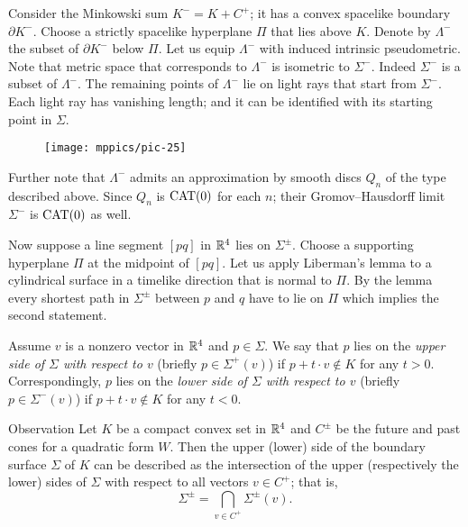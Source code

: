 \documentclass{article}
\begin{document}
Consider the Minkowski sum $K^-=K+C^+$;
it has a convex spacelike boundary $\partial K^-$.
Choose a strictly spacelike hyperplane $\Pi$ that lies above $K$.
Denote by $\Lambda^-$ the subset of $\partial K^-$ below $\Pi$.
Let us equip $\Lambda^-$ with induced intrinsic pseudometric.
Note that metric space that corresponds to $\Lambda^-$ is isometric to $\Sigma^-$.
Indeed $\Sigma^-$ is a subset of $\Lambda^-$.
The remaining points of $\Lambda^-$ lie on light rays that start from $\Sigma^-$.
Each light ray has vanishing length; and it can be identified with its starting point in $\Sigma$. %

\begin{wrapfigure}{r}{61mm}
\vskip-4mm
\centering
\texttt{[image: mppics/pic-25]}
\end{wrapfigure}

Further note that $\Lambda^-$ admits an approximation by smooth discs $Q_n$ of the type described above.
Since $Q_n$ is $\mathrm{CAT}(0)$ for each $n$;
their Gromov--Hausdorff limit $\Sigma^-$ is $\mathrm{CAT}(0)$ as well.

Now suppose a line segment $[pq]$ in $\mathbb{R}^4$ 
lies on $\Sigma^\pm$.
Choose a supporting hyperplane $\Pi$ at the midpoint of $[pq]$. 
Let us apply Liberman's lemma \cite[Theorem~3]{milka} to a cylindrical surface in a timelike direction that is normal to $\Pi$.
By the lemma every shortest path in $\Sigma^\pm$ between $p$ and $q$ have to lie on $\Pi$ which implies the second statement.
\qeds

Assume $v$ is a nonzero vector in $\mathbb{R}^4$ and $p\in\Sigma$.
We say that $p$ lies on the \emph{upper side of $\Sigma$ with respect to $v$} (briefly $p\in \Sigma^+(v)$) if $p+t\cdot v\notin K$ for any $t>0$.
Correspondingly, $p$ lies on the \emph{lower side of $\Sigma$ with respect to $v$} (briefly $p\in \Sigma^-(v)$) if $p+t\cdot v\notin K$ for any $t<0$.

\begin{thm}{Observation}\label{obs:Sigma(v)}
Let $K$ be a compact convex set in $\mathbb{R}^4$ and $C^\pm$ be the future and past cones for a quadratic form $W$.
Then the upper (lower) side of the boundary surface $\Sigma$ of $K$ can be described as the intersection of the upper (respectively the lower) sides of $\Sigma$ with respect to all vectors $v\in C^+$;
that is,
\[\Sigma^\pm=\bigcap_{v\in C^+}\Sigma^\pm(v).\]
\end{thm}
\end{document}

